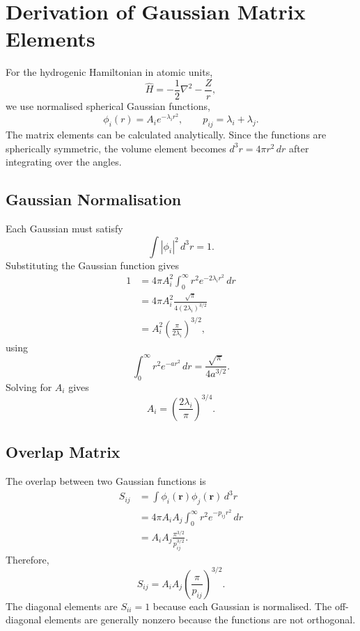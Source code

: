 


\chapter{Derivation of Gaussian Matrix Elements}
\label{app:gaussian-integrals}

For the hydrogenic Hamiltonian in atomic units,
\[
\hat H=-\frac12\nabla^2-\frac{Z}{r},
\]
we use normalised spherical Gaussian functions,
\[
\phi_i(r)=A_i e^{-\lambda_i r^2},
\qquad
p_{ij}=\lambda_i+\lambda_j.
\]
The matrix elements can be calculated analytically.
Since the functions are spherically symmetric, the
volume element becomes $d^3r=4\pi r^2\,dr$ after
integrating over the angles.

\section{Gaussian Normalisation}

Each Gaussian must satisfy
\[
\int|\phi_i|^2\,d^3r=1.
\]
Substituting the Gaussian function gives
\begin{align*}
1
&=4\pi A_i^2
  \int_0^\infty r^2e^{-2\lambda_i r^2}\,dr\\
&=4\pi A_i^2
  \frac{\sqrt{\pi}}{4(2\lambda_i)^{3/2}}\\
&=A_i^2
  \left(\frac{\pi}{2\lambda_i}\right)^{3/2},
\end{align*}
using
\[
\int_0^\infty r^2e^{-ar^2}\,dr
=\frac{\sqrt{\pi}}{4a^{3/2}}.
\]
Solving for $A_i$ gives
\begin{equation}
\boxed{
A_i=\left(\frac{2\lambda_i}{\pi}\right)^{3/4}.
}
\end{equation}

\section{Overlap Matrix}

The overlap between two Gaussian functions is
\begin{align*}
S_{ij}
&=\int\phi_i(\mathbf r)\phi_j(\mathbf r)\,d^3r\\
&=4\pi A_iA_j
  \int_0^\infty r^2e^{-p_{ij}r^2}\,dr\\
&=A_iA_j\frac{\pi^{3/2}}{p_{ij}^{3/2}}.
\end{align*}
Therefore,
\begin{equation}
\boxed{
S_{ij}=A_iA_j
\left(\frac{\pi}{p_{ij}}\right)^{3/2}.
}
\label{eq:appendix-overlap}
\end{equation}
The diagonal elements are $S_{ii}=1$ because each
Gaussian is normalised. The off-diagonal elements
are generally nonzero because the functions are
not orthogonal.

